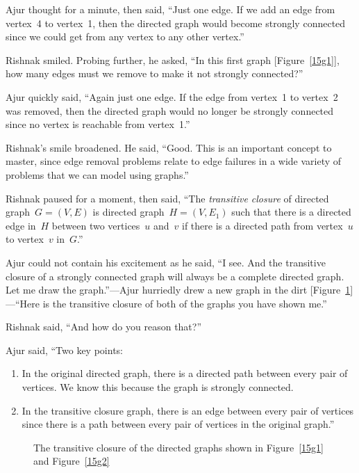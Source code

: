 Ajur thought for a minute, then said, ``Just one edge. If we add an edge from vertex~4 to vertex~1, then the directed graph would become strongly connected since we could get from any vertex to any other vertex.''

Rishnak smiled. Probing further, he asked, ``In this first graph [Figure~\ref{15g1}], how many edges must we remove to make it not strongly connected?''

Ajur quickly said, ``Again just one edge. If the edge from vertex~1 to vertex~2 was removed, then the directed graph would no longer be strongly connected since no vertex is reachable from vertex~1.''

Rishnak's smile broadened. He said, ``Good. This is an important concept to master, since edge removal problems relate to edge failures in a wide variety of problems that we can model using graphs.''

Rishnak paused for a moment, then said, ``The \textit{transitive closure} of directed graph~$G=(V,E)$ is directed graph~$H=(V,E_1)$ such that there is a directed edge in~$H$ between two vertices~$u$ and~$v$ if there is a directed path from vertex~$u$ to vertex~$v$ in~$G$.''

Ajur could not contain his excitement as he said, ``I see. And the transitive closure of a strongly connected graph will always be a complete directed graph. Let me draw the graph.''---Ajur hurriedly drew a new graph in the dirt [Figure~\ref{15g4}]---``Here is the transitive closure of both of the graphs you have shown me.''

Rishnak said, ``And how do you reason that?''

Ajur said, ``Two key points:
\begin{enumerate}
    \item In the original directed graph, there is a directed path between every pair of vertices. We know this because the graph is strongly connected.
    \item In the transitive closure graph, there is an edge between every pair of vertices since there is a path between every pair of vertices in the original graph.''
\end{enumerate}

\begin{figure}
\begin{center}
\caption{The transitive closure of the directed graphs shown in Figure~\ref{15g1} and Figure~\ref{15g2}}\label{15g4}
\end{center}
\end{figure}

